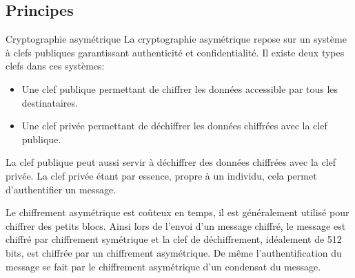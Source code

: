 \documentclass[twoside,a4paper,12pt,titlepage]{book}
\begin{document}
\subsection{Principes}
\begin{Define}{Cryptographie asymétrique}
La cryptographie asymétrique repose sur un système à clefs publiques garantissant authenticité et confidentialité. Il existe deux types clefs dans ces systèmes:\begin{itemize}
\item Une clef publique permettant de chiffrer les données accessible par tous les destinataires.
\item Une clef privée permettant de déchiffrer les données chiffrées avec la clef publique.
\end{itemize}
La clef publique peut aussi servir à déchiffrer des données chiffrées avec la clef privée. La clef privée étant par essence, propre à un individu, cela permet d'authentifier un message.
\end{Define}
\begin{Warning}
Le chiffrement asymétrique est coûteux en temps, il est généralement utilisé pour chiffrer des petits blocs. Ainsi lors de l'envoi d'un message chiffré, le message est chiffré par chiffrement symétrique et la clef de déchiffrement, idéalement de 512 bits, est chiffrée par un chiffrement asymétrique. De même l'authentification du message se fait par le chiffrement asymétrique d'un condensat du message.
\end{Warning}
\end{document}

